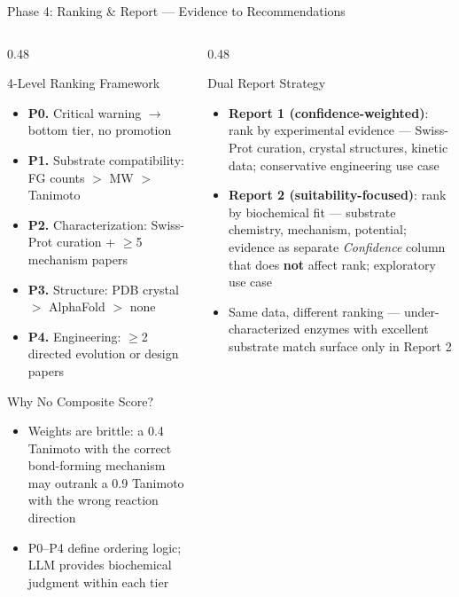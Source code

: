 \documentclass[aspectratio=169, 11pt]{beamer}
\begin{document}
\begin{frame}{Phase 4: Ranking \& Report --- Evidence to Recommendations}
\vspace{-12pt}
\begin{columns}[T]
\begin{column}{0.48\textwidth}
\begin{block}{\small 4-Level Ranking Framework}
\vspace{-2pt}
\begin{itemize}\scriptsize
\setlength\itemsep{1pt}
\item \textbf{P0.} {\color{accentred}Critical warning} $\rightarrow$ bottom tier, no promotion
\item \textbf{P1.} Substrate compatibility: FG counts $>$ MW $>$ Tanimoto
\item \textbf{P2.} Characterization: Swiss-Prot curation + $\geq$5 mechanism papers
\item \textbf{P3.} Structure: PDB crystal $>$ AlphaFold $>$ none
\item \textbf{P4.} Engineering: $\geq$2 directed evolution or design papers
\end{itemize}
\end{block}

\vspace{1pt}
\begin{alertblock}{\small Why No Composite Score?}
\vspace{-2pt}
\begin{itemize}\scriptsize
\setlength\itemsep{0pt}
\item Weights are brittle: a 0.4 Tanimoto with the correct bond-forming mechanism may outrank a 0.9 Tanimoto with the wrong reaction direction
\item P0--P4 define ordering logic; LLM provides biochemical judgment within each tier
\end{itemize}
\end{alertblock}
\end{column}
\begin{column}{0.48\textwidth}
\begin{exampleblock}{\small Dual Report Strategy}
\vspace{-2pt}
\begin{itemize}\scriptsize
\setlength\itemsep{0pt}
\item \textbf{Report 1 (confidence-weighted)}: rank by experimental evidence --- Swiss-Prot curation, crystal structures, kinetic data; conservative engineering use case
\item \textbf{Report 2 (suitability-focused)}: rank by biochemical fit --- substrate chemistry, mechanism, potential; evidence as separate \textit{Confidence} column that does \textbf{not} affect rank; exploratory use case
\item Same data, different ranking --- under-characterized enzymes with excellent substrate match surface only in Report 2
\end{itemize}
\end{exampleblock}


\end{column}
\end{columns}
\end{frame}
\end{document}
